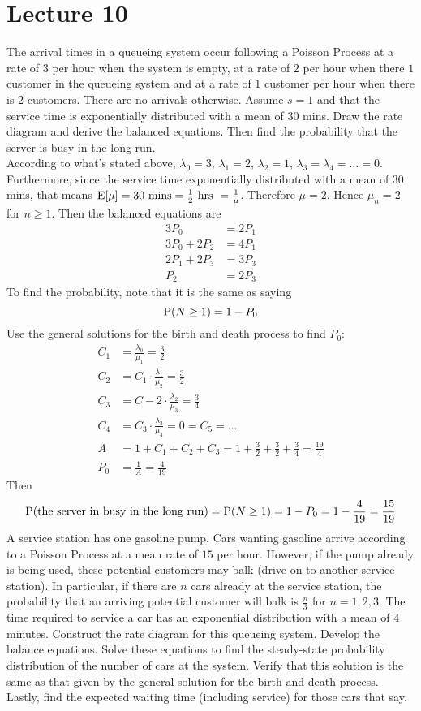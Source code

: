 \documentclass[12pt]{article}
\begin{document}
\section{Lecture 10} 
The arrival times in a queueing system occur following a Poisson Process at a rate of $3$ per hour when the system is empty, at a rate of $2$ per hour when there $1$ customer in the queueing system and at a rate of $1$ customer per hour when there is $2$ customers. There are no arrivals otherwise. Assume $s=1$ and that the service time is exponentially distributed with a mean of $30$ mins. Draw the rate diagram and derive the balanced equations. Then find the probability that the server is busy in the long run. \\
According to what's stated above, $\lambda_0 = 3$, $\lambda_1 = 2$, $\lambda_2 = 1$, $\lambda_3 = \lambda_4 = \dots = 0$. Furthermore, since the service time exponentially distributed with a mean of $30$ mins, that means $\mathrm{E}[ \mu ] = 30 \text{ mins} = \frac{1}{2} \text{ hrs } = \frac{1}{\mu}$. Therefore $\mu = 2$. Hence $\mu_n = 2$ for $n\geq 1$. Then the balanced equations are $$ \begin{aligned} 
3P_0 &= 2P_1 \\ 3P_0 + 2P_2 &= 4P_1 \\ 2P_1 + 2P_3 &= 3P_3 \\ P_2 &= 2P_3 \end{aligned} $$ 
To find the probability, note that it is the same as saying $$\mathrm{P}( N \geq 1 ) = 1 - P_0$$ 
Use the general solutions for the birth and death process to find $P_0$: $$ \begin{aligned} C_1 &= \frac{\lambda_0}{\mu_1} = \frac{3}{2} \\ C_2 &= C_1 \cdot \frac{\lambda_1}{\mu_2} = \frac{3}{2} \\ C_3 &= C-2 \cdot \frac{\lambda_2}{\mu_3} = \frac{3}{4} \\ C_4 &= C_3 \cdot \frac{ \lambda_3}{\mu_4} = 0 = C_5 = \dots \\ A &= 1 + C_1 + C_2 + C_3 = 1 + \frac{3}{2} + \frac{3}{2} + \frac{3}{4} = \frac{19}{4} \\ P_0 &= \frac{1}{A} = \frac{4}{19} \end{aligned} $$ 
Then $$\mathrm{P}( \text{the server in busy in the long run} ) = \mathrm{P}( N \geq 1 ) = 1 - P_0 = 1 - \frac{4}{19} = \frac{15}{19} $$ 
A service station has one gasoline pump. Cars wanting gasoline arrive according to a Poisson Process at a mean rate of $15$ per hour. However, if the pump already is being used, these potential customers may balk (drive on to another service station). In particular, if there are $n$ cars already at the service station, the probability that an arriving potential customer will balk is $\frac{n}{3}$ for $n=1,2,3$. The time required to service a car has an exponential distribution with a mean of $4$ minutes. Construct the rate diagram for this queueing system. Develop the balance equations. Solve these equations to find the steady-state probability distribution of the number of cars at the system. Verify that this solution is the same as that given by the general solution for the birth and death process. Lastly, find the expected waiting time (including service) for those cars that say. 
\end{document}
